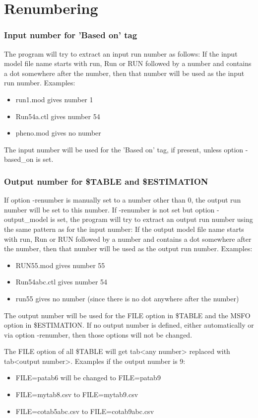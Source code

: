 \section{Renumbering}
\subsubsection*{Input number for 'Based on' tag}
The program will try to extract an input run number as follows: If the input model file name
starts with run, Run or RUN followed by a number and contains a dot 
somewhere after the number, then that number will be used as the input run number. Examples:
\begin{itemize}
\item run1.mod gives number 1
\item Run54a.ctl gives number 54
\item pheno.mod gives no number 
\end{itemize}
\noindent The input number will be used for the 'Based on' tag, if present, unless option
-based\_on is set.
\subsubsection*{Output number for \$TABLE and \$ESTIMATION}
If option -renumber is manually set to a number other than 0, the output run number will
be set to this number. If -renumber is not set but option -output\_model is set,
the program will try to extract an output run number using the same pattern
as for the input number: If the output model file name
starts with run, Run or RUN followed by a number and contains a dot 
somewhere after the number, then that number will be used as the output run number. Examples:
\begin{itemize}
\item RUN55.mod gives number 55
\item Run54abc.ctl gives number 54
\item run55 gives no number (since there is no dot anywhere after the number)
\end{itemize}

\noindent The output number will be used for the FILE option in \$TABLE and the MSFO option in
\$ESTIMATION. If no output number is defined, either automatically or via option -renumber, 
then those options will not be changed.

The FILE option of all \$TABLE will get tab<any number> replaced with tab<output number>. 
Examples if the output number is 9:
\begin{itemize}
\item FILE=patab6 will be changed to FILE=patab9
\item FILE=mytab8.csv to FILE=mytab9.csv
\item FILE=cotab5abc.csv to FILE=cotab9abc.csv
\end{itemize}

